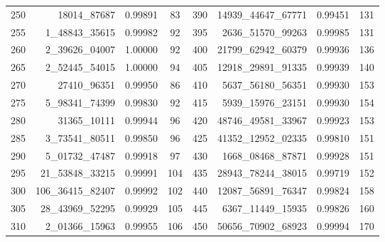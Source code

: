 \documentclass[preprint]{sigplanconf}
\begin{document}
\begin{table}
\begin{center}
\begin{tabular}{|c r c c| c r c c|}
            250             & 18014\_87687      & 0.99891          & 83              & 390          & 14939\_44647\_67771    & 0.99451          & 131             \\
            255             & 1\_48843\_35615   & 0.99982          & 92              & 395          & 2636\_51570\_99263     & 0.99985          & 131             \\
            260             & 2\_39626\_04007   & 1.00000          & 92              & 400          & 21799\_62942\_60379    & 0.99936          & 136             \\
            265             & 2\_52445\_54015   & 1.00000          & 94              & 405          & 12918\_29891\_91335    & 0.99939          & 140             \\
            270             & 27410\_96351      & 0.99950          & 86              & 410          & 5637\_56180\_56351     & 0.99930          & 153             \\
            275             & 5\_98341\_74399   & 0.99830          & 92              & 415          & 5939\_15976\_23151     & 0.99930          & 154             \\
            280             & 31365\_10111      & 0.99944          & 96              & 420          & 48746\_49581\_33967    & 0.99923          & 153             \\
            285             & 3\_73541\_80511   & 0.99850          & 96              & 425          & 41352\_12952\_02335    & 0.99810          & 151             \\
            290             & 5\_01732\_47487   & 0.99918          & 97              & 430          & 1668\_08468\_87871     & 0.99928          & 151             \\
            295             & 21\_53848\_33215  & 0.99991          & 104             & 435          & 28943\_78244\_38015    & 0.99719          & 152             \\
            300             & 106\_36415\_82407 & 0.99992          & 102             & 440          & 12087\_56891\_76347    & 0.99824          & 158             \\
            305             & 28\_43969\_52295  & 0.99929          & 105             & 445          & 6367\_11449\_15935     & 0.99826          & 160             \\
            310             & 2\_01366\_15963   & 0.99955          & 106             & 450          & 50656\_70902\_68923    & 0.99994          & 170             \\

\end{tabular}
\end{center}
\end{table}
\end{document}
